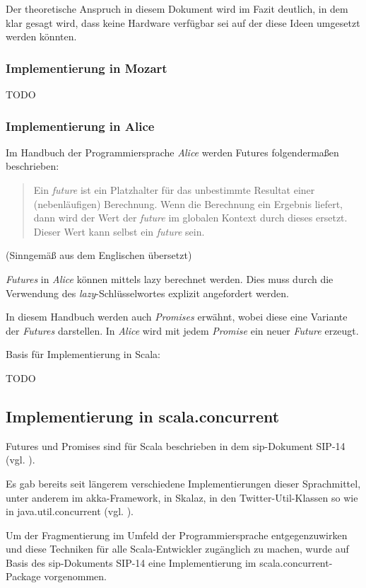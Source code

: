 \documentclass[11pt,a4paper,titlepage,ngerman]{scrartcl}
\begin{document}
Der theoretische Anspruch in diesem Dokument wird im Fazit deutlich, in dem klar 
gesagt wird, dass keine Hardware verfügbar sei auf der diese Ideen umgesetzt 
werden könnten.

\subsubsection{Implementierung in Mozart \cite{futures:98}}

TODO

\subsubsection{Implementierung in Alice \cite{aliceFuture}}

Im Handbuch der Programmiersprache \emph{Alice} werden Futures folgendermaßen
beschrieben:
\begin{quote}
Ein \emph{future} ist ein Platzhalter für das unbestimmte Resultat einer
(nebenläufigen) Berechnung. Wenn die Berechnung ein Ergebnis liefert, dann
wird der Wert der \emph{future} im globalen Kontext durch dieses ersetzt.
Dieser Wert kann selbst ein \emph{future} sein.
\end{quote} (Sinngemäß aus dem Englischen übersetzt)

\emph{Futures} in \emph{Alice} können mittels \gls{lazy} berechnet werden. 
Dies muss durch die Verwendung des \emph{lazy}-Schlüsselwortes explizit angefordert werden.

In diesem Handbuch werden auch \emph{Promises} erwähnt, wobei diese eine Variante
der \emph{Futures} darstellen. In \emph{Alice} wird mit jedem \emph{Promise}
ein neuer \emph{Future} erzeugt.

Basis für Implementierung in Scala: \cite{Lea:2000:JFF:337449.337465}

TODO

\subsection{Implementierung in scala.concurrent}

Futures und Promises sind für Scala beschrieben in dem \gls{sip}-Dokument SIP-14 
(vgl. \cite{sip14}).

Es gab bereits seit längerem verschiedene Implementierungen dieser Sprachmittel,
unter anderem im \gls{akka}-Framework, in Skalaz, in den Twitter-Util-Klassen so wie
in java.util.concurrent (vgl. \cite{futuresTry}).

Um der Fragmentierung im Umfeld der Programmiersprache entgegenzuwirken und
diese Techniken für alle Scala-Entwickler zugänglich zu machen, wurde auf Basis
des \gls{sip}-Dokuments SIP-14 eine Implementierung im scala.concurrent-Package
vorgenommen.
\end{document}
